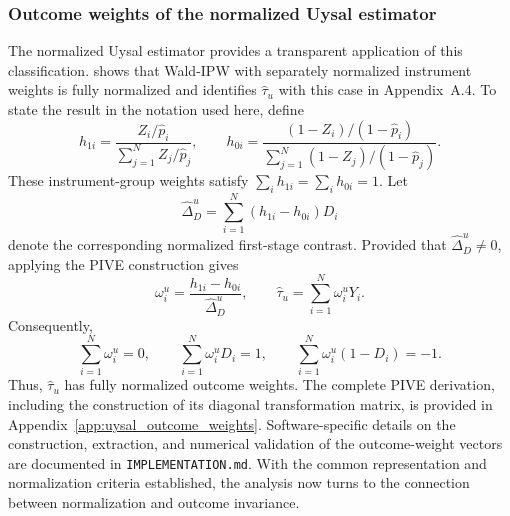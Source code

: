 \documentclass[12pt, a4paper, oneside]{article}
\theoremstyle{plain}
\theoremstyle{definition}
\begin{document}
\subsubsection{Outcome weights of the normalized Uysal estimator}
\label{subsec:omega_u}

The normalized Uysal estimator provides a transparent application of this
classification. \citet[Section~4.2.4]{knaus2024treatment} shows that Wald-IPW
with separately normalized instrument weights is fully normalized and
identifies \(\widehat{\tau}_u\) with this case in Appendix~A.4. To state the
result in the notation used here, define
\begin{equation}
    h_{1i}
    =
    \frac{Z_i/\widehat p_i}
         {\sum_{j=1}^{N}Z_j/\widehat p_j},
    \qquad
    h_{0i}
    =
    \frac{(1-Z_i)/(1-\widehat p_i)}
         {\sum_{j=1}^{N}(1-Z_j)/(1-\widehat p_j)}.
    \label{eq:uysal_normalized_instrument_weights}
\end{equation}
These instrument-group weights satisfy
\(\sum_i h_{1i}=\sum_i h_{0i}=1\). Let
\begin{equation}
    \widehat{\Delta}_D^u
    =
    \sum_{i=1}^{N}(h_{1i}-h_{0i})D_i
    \label{eq:uysal_normalized_first_stage}
\end{equation}
denote the corresponding normalized first-stage contrast. Provided that
\(\widehat{\Delta}_D^u\neq0\), applying the PIVE construction gives
\begin{equation}
    \omega_i^u
    =
    \frac{h_{1i}-h_{0i}}
         {\widehat{\Delta}_D^u},
    \qquad
    \widehat{\tau}_u
    =
    \sum_{i=1}^{N}\omega_i^uY_i.
    \label{eq:uysal_outcome_weights_main}
\end{equation}
Consequently,
\begin{equation}
    \sum_{i=1}^{N}\omega_i^u=0,
    \qquad
    \sum_{i=1}^{N}\omega_i^uD_i=1,
    \qquad
    \sum_{i=1}^{N}\omega_i^u(1-D_i)=-1.
    \label{eq:uysal_normalization_main}
\end{equation}
Thus, \(\widehat{\tau}_u\) has fully normalized outcome weights. The complete
PIVE derivation, including the construction of its diagonal transformation
matrix, is provided in Appendix~\ref{app:uysal_outcome_weights}.
Software-specific details on the construction, extraction, and numerical
validation of the outcome-weight vectors are documented in
\texttt{IMPLEMENTATION.md}. With the common representation and normalization
criteria established, the analysis now turns to the connection between
normalization and outcome invariance.
\end{document}
